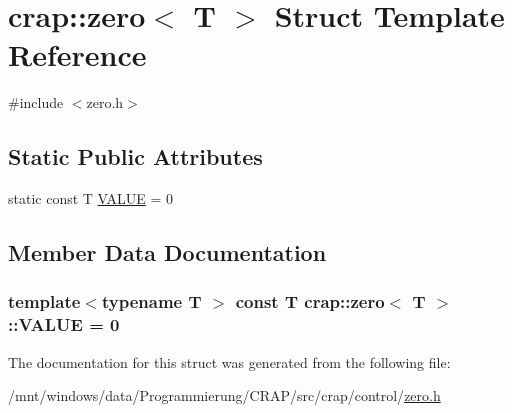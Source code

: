 \hypertarget{structcrap_1_1zero}{\section{crap\-:\-:zero$<$ T $>$ Struct Template Reference}
\label{structcrap_1_1zero}
}


{\ttfamily \#include $<$zero.\-h$>$}

\subsection*{Static Public Attributes}
\begin{DoxyCompactItemize}
\item 
static const T \hyperlink{structcrap_1_1zero_adbf136ea6f7260ed699f6cbbb3a9ea46}{V\-A\-L\-U\-E} = 0
\end{DoxyCompactItemize}


\subsection{Member Data Documentation}
\hypertarget{structcrap_1_1zero_adbf136ea6f7260ed699f6cbbb3a9ea46}{
\subsubsection[{V\-A\-L\-U\-E}]{\setlength{\rightskip}{0pt plus 5cm}template$<$typename T $>$ const T {\bf crap\-::zero}$<$ T $>$\-::V\-A\-L\-U\-E = 0\hspace{0.3cm}{\ttfamily [static]}}}\label{structcrap_1_1zero_adbf136ea6f7260ed699f6cbbb3a9ea46}


The documentation for this struct was generated from the following file\-:\begin{DoxyCompactItemize}
\item 
/mnt/windows/data/\-Programmierung/\-C\-R\-A\-P/src/crap/control/\hyperlink{zero_8h}{zero.\-h}\end{DoxyCompactItemize}
